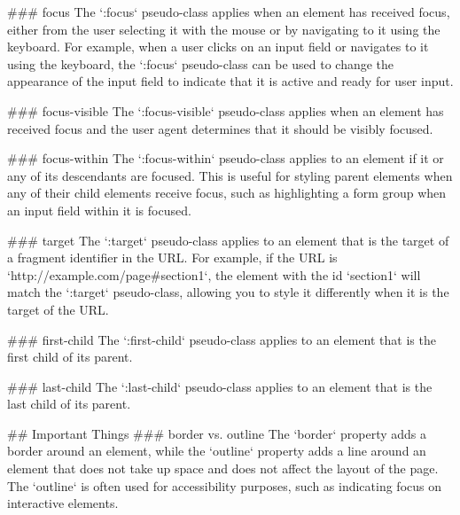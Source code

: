 ### focus
The `:focus` pseudo-class applies when an element has received focus, either from the user selecting it with the mouse or by navigating to it using the keyboard.
For example, when a user clicks on an input field or navigates to it using the keyboard, the `:focus` pseudo-class can be used to change the appearance of the input field to indicate that it is active and ready for user input.

### focus-visible
The `:focus-visible` pseudo-class applies when an element has received focus and the user agent determines that it should be visibly focused.

### focus-within
The `:focus-within` pseudo-class applies to an element if it or any of its descendants are focused.
This is useful for styling parent elements when any of their child elements receive focus, such as highlighting a form group when an input field within it is focused.

### target
The `:target` pseudo-class applies to an element that is the target of a fragment identifier in the URL.
For example, if the URL is `http://example.com/page#section1`, the element with the id `section1` will match the `:target` pseudo-class, allowing you to style it differently when it is the target of the URL.

### first-child
The `:first-child` pseudo-class applies to an element that is the first child of its parent.

### last-child
The `:last-child` pseudo-class applies to an element that is the last child of its parent.


## Important Things
### border vs. outline
The `border` property adds a border around an element, while the `outline` property adds a line around an element that does not take up space and does not affect the layout of the page. 
The `outline` is often used for accessibility purposes, such as indicating focus on interactive elements.